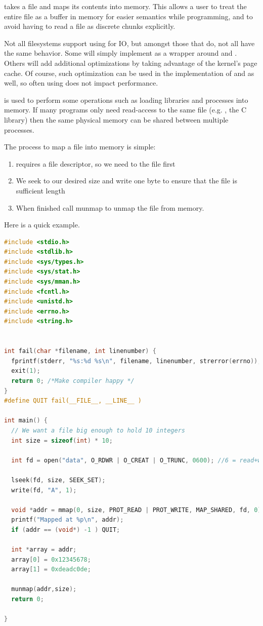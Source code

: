  takes a file and maps its contents into memory. This allows a user to treat the entire file as a buffer in memory for easier semantics while programming, and to avoid having to read a file as discrete chunks explicitly.

Not all filesystems support using  for IO, but amongst those that do, not all have the same behavior. Some will simply implement  as a wrapper around  and . Others will add additional optimizations by taking advantage of the kernel's page cache. Of course, such optimization can be used in the implementation of  and  as well, so often using  does not impact performance.

 is used to perform some operations such as loading libraries and processes into memory. If many programs only need read-access to the same file (e.g. , the C library) then the same physical memory can be shared between multiple processes.

The process to map a file into memory is simple:

\begin{enumerate}
\item {} requires a file descriptor, so we need to  the file first
\item We seek to our desired size and write one byte to ensure that the file is sufficient length
\item When finished call munmap to unmap the file from memory.
\end{enumerate}

Here is a quick example.

\begin{lstlisting}[language=C]
#include <stdio.h>
#include <stdlib.h>
#include <sys/types.h>
#include <sys/stat.h>
#include <sys/mman.h>
#include <fcntl.h>
#include <unistd.h>
#include <errno.h>
#include <string.h>


int fail(char *filename, int linenumber) {
  fprintf(stderr, "%s:%d %s\n", filename, linenumber, strerror(errno));
  exit(1);
  return 0; /*Make compiler happy */
}
#define QUIT fail(__FILE__, __LINE__ )

int main() {
  // We want a file big enough to hold 10 integers
  int size = sizeof(int) * 10;

  int fd = open("data", O_RDWR | O_CREAT | O_TRUNC, 0600); //6 = read+write for me!

  lseek(fd, size, SEEK_SET);
  write(fd, "A", 1);

  void *addr = mmap(0, size, PROT_READ | PROT_WRITE, MAP_SHARED, fd, 0);
  printf("Mapped at %p\n", addr);
  if (addr == (void*) -1 ) QUIT;

  int *array = addr;
  array[0] = 0x12345678;
  array[1] = 0xdeadc0de;

  munmap(addr,size);
  return 0;

}
\end{lstlisting}

